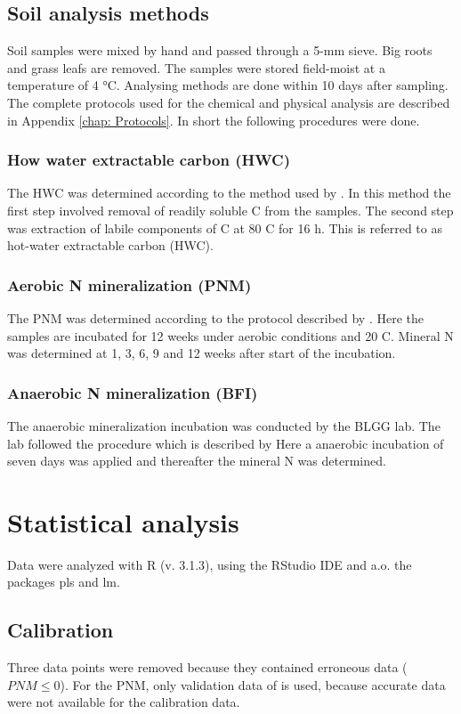 \documentclass[10pt,twoside,dutch,english]{report}
\begin{document}
\subsection{Soil analysis methods}
Soil samples were mixed by hand and passed through a 5-mm sieve. Big roots and grass leafs are removed. The samples were stored field-moist at a temperature of 4 °C. Analysing methods are done within 10 days after sampling. 
The complete protocols used for the chemical and physical analysis are described in Appendix \ref{chap: Protocols}. In short the following procedures were done. 

\subsubsection{How water extractable carbon (HWC)}
The HWC was determined according to the method used by \citet{Ghani2003}. In this method the first step involved removal of readily soluble C from the samples. The second step was extraction of labile components of C at 80 \degree C for 16 h. This is referred to as hot-water extractable carbon (HWC).

\subsubsection{Aerobic N mineralization (PNM)}
The PNM was determined according to the protocol described by \citet{Ros2014}. Here the samples are incubated for 12 weeks under aerobic conditions and 20 \degree C. Mineral N was determined at 1, 3, 6, 9 and 12 weeks after start of the incubation. 

\subsubsection{Anaerobic N mineralization (BFI)}
The anaerobic mineralization incubation was conducted by the BLGG lab. The lab followed the procedure which is described by \citet{Hanegraaf2008} Here a anaerobic incubation of seven days was applied and thereafter the mineral N was determined. 



\section{Statistical analysis}
Data were analyzed with R (v. 3.1.3), using the RStudio IDE and a.o. the packages pls and lm. 
\subsection{Calibration}
Three data points were removed because they contained erroneous data ($PNM\leq 0$). For the PNM, only validation data of  is used, because accurate  data were not available for the calibration data. 
\end{document}

